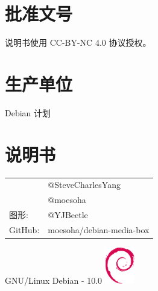 \documentclass{article}
\begin{document}
\begin{multicols*}{3}
	\section*{批准文号}

	说明书使用 CC-BY-NC 4.0 协议授权。


	\section*{生产单位}

	Debian 计划


	\section*{说明书}
	\begin{tabularx}{\linewidth}{@{}ll@{}}
		\multirow{2}{*}{}{编审：} & @SteveCharlesYang\\
		~ & @moesoha \\
		图形: & @YJBeetle\\
		GitHub: & moesoha/debian-media-box\\
	\end{tabularx}


	\vfill
	\begin{flushright}
		GNU/Linux Debian - 10.0
		\linebreak
		\newline
		\includegraphics[width=13mm]{assets/debian-logo.eps}
	\end{flushright}

\end{multicols*}
\end{document}
